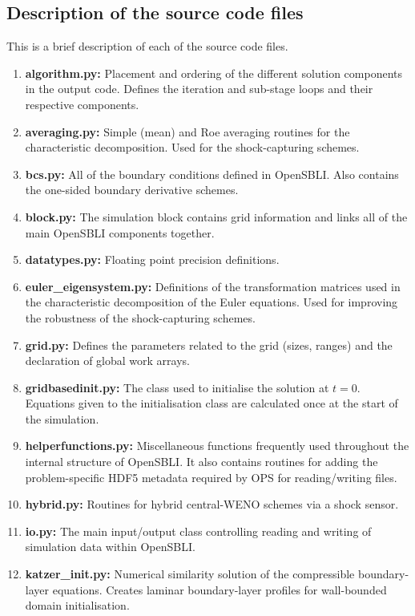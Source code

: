 \documentclass[11pt]{article}
\begin{document}
\subsection{Description of the source code files}
This is a brief description of each of the source code files.
\begin{enumerate}
	\item{\textbf{algorithm.py:} Placement and ordering of the different solution components in the output code. Defines the iteration and sub-stage loops and their respective components.}
	\item{\textbf{averaging.py:} Simple (mean) and Roe averaging routines for the characteristic decomposition. Used for the shock-capturing schemes.}
	\item{\textbf{bcs.py:} All of the boundary conditions defined in OpenSBLI. Also contains the one-sided boundary derivative schemes.}
	\item{\textbf{block.py:} The simulation block contains grid information and links all of the main OpenSBLI components together.}
	\item{\textbf{datatypes.py:} Floating point precision definitions.}
	\item{\textbf{euler\_eigensystem.py:} Definitions of the transformation matrices used in the characteristic decomposition of the Euler equations. Used for improving the robustness of the shock-capturing schemes.}
	\item{\textbf{grid.py:} Defines the parameters related to the grid (sizes, ranges) and the declaration of global work arrays.}
	\item{\textbf{gridbasedinit.py:} The class used to initialise the solution at $t=0$. Equations given to the initialisation class are calculated once at the start of the simulation.}
	\item{\textbf{helperfunctions.py:} Miscellaneous functions frequently used throughout the internal structure of OpenSBLI. It also contains routines for adding the problem-specific HDF5 metadata required by OPS for reading/writing files.}	
	\item{\textbf{hybrid.py:} Routines for hybrid central-WENO schemes via a shock sensor.}
	\item{\textbf{io.py:} The main input/output class controlling reading and writing of simulation data within OpenSBLI.}
	\item{\textbf{katzer\_init.py:} Numerical similarity solution of the compressible boundary-layer equations. Creates laminar boundary-layer profiles for wall-bounded domain initialisation.}	

\end{enumerate}
\end{document}
